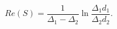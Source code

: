 \begin{equation}
Re(S) = \frac{1}{\Delta_1 -\Delta_2} 
\ln \frac{\Delta_1 d_1}{\Delta_2d_2} .
\label{RT-sol-2}
\end{equation}

